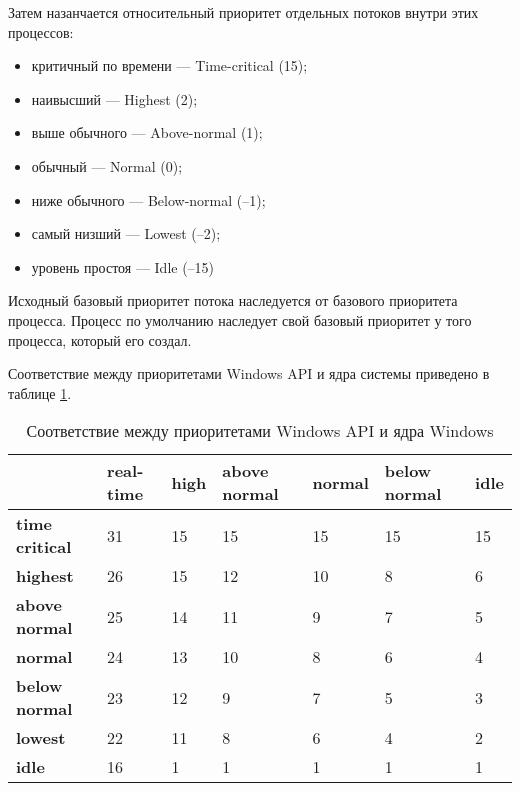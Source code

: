 Затем назанчается относительный приоритет отдельных потоков внутри этих
процессов:
\begin{itemize}[left=\parindent]
    \item критичный по времени — Time-critical (15);
    \item наивысший — Highest (2);
    \item выше обычного — Above-normal (1);
    \item обычный — Normal (0);
    \item ниже обычного — Below-normal (–1);
    \item самый низший — Lowest (–2);
    \item уровень простоя — Idle (–15)
\end{itemize}

Исходный базовый приоритет потока наследуется от базового приоритета процесса.
Процесс по умолчанию наследует свой базовый приоритет у того процесса, который
его создал.

Соответствие между приоритетами Windows API и ядра системы приведено в таблице
\ref{tab:priority}.

\begin{table}[h]
    \caption{Соответствие между приоритетами Windows API и ядра Windows}
    \begin{center}
        \begin{tabular}{|l|p{45pt}|p{45pt}|p{45pt}|p{45pt}|p{45pt}|p{45pt}|}
            \hline
            {} & \textbf{real-time} & \textbf{high} & \textbf{above normal} &
            \textbf{normal} & \textbf{below normal} & \textbf{idle}\\
            \hline
            \textbf{time critical} & 31 & 15 & 15 & 15 & 15 & 15 \\
            \hline
            \textbf{highest} & 26 & 15 & 12 & 10 & 8 & 6 \\
            \hline
            \textbf{above normal} & 25 & 14 & 11 & 9 & 7 & 5 \\
            \hline
            \textbf{normal} & 24 & 13 & 10 & 8 & 6 & 4 \\
            \hline
            \textbf{below normal} & 23 & 12 & 9 & 7 & 5 & 3 \\
            \hline
            \textbf{lowest} & 22 & 11 & 8 & 6 & 4 & 2 \\
            \hline
            \textbf{idle} & 16 & 1 & 1 & 1 & 1 & 1 \\
            \hline
        \end{tabular}
    \end{center}
    \label{tab:priority}
\end{table}

